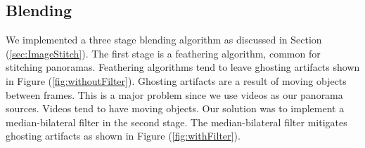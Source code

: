 \subsection{Blending} \label{sec:BlendExpSec}

We implemented a three stage blending algorithm as discussed in Section (\ref{sec:ImageStitch}).  
The first stage is a feathering algorithm, common for stitching panoramas.
Feathering algorithms tend to leave ghosting artifacts shown in Figure (\ref{fig:withoutFilter}).
Ghosting artifacts are a result of moving objects between frames.  This is a major problem since we use videos as our panorama sources.
Videos tend to have moving objects.  Our solution was to implement a median-bilateral filter in the second stage.
The median-bilateral filter mitigates ghosting artifacts as shown in Figure (\ref{fig:withFilter}).



